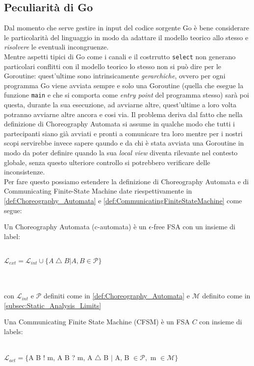 \subsection{Peculiarità di Go}
Dal momento che serve gestire in input del codice sorgente Go è bene considerare le particolarità del linguaggio in modo da adattare il modello teorico allo stesso e \emph{risolvere} le eventuali incongruenze.\bigskip \\
Mentre aspetti tipici di Go come i canali e il costrrutto \texttt{select} non generano particolari conflitti con il modello teorico lo stesso non si può dire per le Goroutine: quest'ultime sono intrinsicamente \emph{gerarchiche}, ovvero per ogni programma Go viene avviata sempre e solo una Goroutine (quella che esegue la funzione \texttt{main} e che si comporta come \emph{entry point} del programma stesso) sarà poi questa, durante la sua esecuzione, ad avviarne altre, quest'ultime a loro volta potranno avviarne altre ancora e cosi via.
Il problema deriva dal fatto che nella definizione di Choreography Automata si assume in qualche modo che tutti i partecipanti siano già avviati e pronti a comunicare tra loro mentre per i nostri scopi servirebbe invece sapere qaundo e da chi è stata avviata una Goroutine in modo da poter definire quando la sua \emph{local view} diventa rilevante nel contesto globale, senza questo ulteriore controllo si potrebbero verificare delle inconsistenze.\bigskip \\
Per fare questo possiamo estendere la definizione di Choreography Automata e di Communicating Finite-State Machine date riespettivamente in \ref{def:Choreography_Automata} e \ref{def:CommunicatingFiniteStateMachine} come segue:

\begin{definition}
    Un Choreography Automata (c-automata) è un $\epsilon$-free FSA con un insieme di label:\\ \\
    \centerline{$\mathcal{L}_{ext} = \mathcal{L}_{int} \cup \{ A \bigtriangleup B | A, B \in \mathcal{P}\}$}\\ \\
    con $\mathcal{L}_{int}$ e $\mathcal{P}$ definiti come in \ref{def:Choreography_Automata} e $\mathcal{M}$ definito come in \ref{subsec:Static_Analysis_Limits}
\end{definition}

\begin{definition}
    Una Communicating Finite State Machine (CFSM) è un FSA $C$ con insieme di labels:
    \\ \\
    \centerline{$\mathcal{L}_{act} = \{$A B ! m, A B ? m, A $\bigtriangleup$ B $|$ A, B $ \in \mathcal{P},$ m $ \in \mathcal{M}\}$}
\end{definition}

